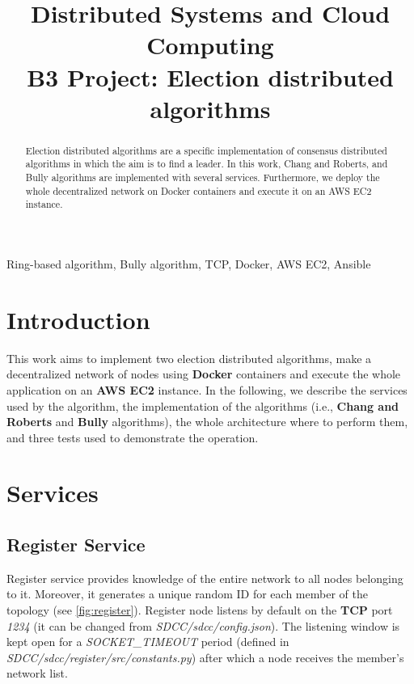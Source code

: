 \documentclass[conference]{IEEEtran}
\begin{document}
\title{Distributed Systems and Cloud Computing \\ 
B3 Project: Election distributed algorithms}

\author{
}

\maketitle

\begin{abstract}
Election distributed algorithms are a specific implementation of consensus distributed algorithms in which the aim is to find a leader. In this work, Chang and Roberts, and Bully algorithms are implemented with several services. Furthermore, we deploy the whole decentralized network on Docker containers and execute it on an AWS EC2 instance.
\end{abstract}

\begin{IEEEkeywords}
Ring-based algorithm, Bully algorithm, TCP, Docker, AWS EC2, Ansible
\end{IEEEkeywords}

\section{Introduction}
This work aims to implement two election distributed algorithms, make a decentralized network of nodes using \textbf{Docker} containers and execute the whole application on an \textbf{AWS EC2} instance. 
In the following, we describe the services used by the algorithm, the implementation of the algorithms (i.e., \textbf{Chang and Roberts} and \textbf{Bully} algorithms), the whole architecture where to perform them, and three tests used to demonstrate the operation.

\section{Services}

\subsection{Register Service}\label{register}

Register service provides knowledge of the entire network to all nodes belonging to it. Moreover, it generates a unique random ID for each member of the topology (see \ref{fig:register}). Register node listens by default on the \textbf{TCP} port \textit{1234} (it can be changed from \textit{SDCC/sdcc/config.json}). The listening window is kept open for a \textit{SOCKET\_TIMEOUT} period (defined in \textit{SDCC/sdcc/register/src/constants.py}) after which a node receives the member's network list. 
\end{document}
